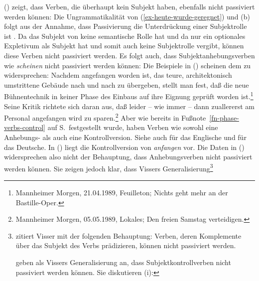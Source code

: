 () zeigt, dass Verben, die überhaupt kein Subjekt haben, ebenfalls nicht passiviert werden können:
\eal
{}
\zl
Die Ungrammatikalität von (\ref{ex-heute-wurde-geregnet}) und (b) folgt
aus der Annahme, dass Passivierung die Unterdrückung einer Subjektrolle\label{ex-ps-demotion-subject-role}
ist \citep[]{ps2}. Da das Subjekt von 
keine semantische Rolle hat und da  nur ein optionales Expletivum
als Subjekt hat und somit auch keine
Subjektrolle vergibt, können diese Verben nicht passiviert werden.
Es folgt auch, dass Subjektanhebungsverben wie \zb \emph{scheinen} nicht passiviert
werden können:\label{subjekt-raising-kein-passiv}
\z
Die Beispiele in () scheinen dem zu widersprechen:
\eal
\ex Nachdem angefangen worden ist, das teure, architektonisch umstrittene Gebäude nach und nach zu übergeben, 
    stellt man fest, daß die neue Bühnentechnik in keiner Phase des Einbaus auf ihre Eignung geprüft worden ist.\footnote{
Mannheimer Morgen, 21.04.1989, Feuilleton; Nichts geht mehr an der Bastille-Oper.%
        }
\ex Seine Kritik richtete sich daran aus, daß leider -- wie immer -- dann zuallererst am Personal angefangen wird zu sparen.\footnote{
       Mannheimer Morgen, 05.05.1989, Lokales; Den freien Samstag verteidigen.%
}
\zl
Aber wie bereits in Fußnote~\ref{fn-phase-verbs-control} auf S.\,\pageref{fn-phase-verbs-control} festgestellt
wurde, haben Verben wie  sowohl eine Anhebungs- als auch
eine Kontrollversion. Siehe auch  für das Englische
und  für das Deutsche. In () liegt die Kontrollversion von \emph{anfangen} vor.
Die Daten in () widersprechen also nicht der Behauptung, dass Anhebungsverben nicht passiviert
werden können. Sie zeigen jedoch klar, 
dass Vissers Generalisierung\footnote{
        \citet[]{Bresnan82c} zitiert Visser mit der folgenden Behauptung:
        Verben, deren Komplemente über das Subjekt des Verbs prädizieren, können nicht passiviert werden.

        \citet[]{ps2} geben als Vissers Generalisierung an,
        dass Subjektkontrollverben nicht passiviert werden können.
        Sie diskutieren (i):
        \eal
        \zllast
}
